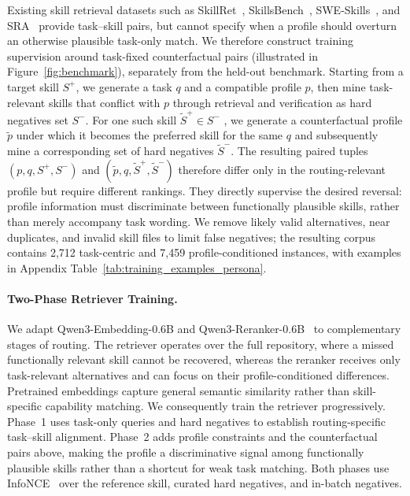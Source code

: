 \documentclass[letterpaper]{article} %
\begin{document}
Existing skill retrieval datasets such as SkillRet~\cite{cho2026skillretlargescalebenchmarkskill}, SkillsBench~\cite{li2026skillsbenchbenchmarkingagentskills}, SWE-Skills~\cite{han2026sweskillsbenchagentskillsactually}, and SRA~\cite{su2026skillretrievalaugmentationagentic} provide task--skill pairs, but cannot specify when a profile should overturn an otherwise plausible task-only match. We therefore construct training supervision around task-fixed counterfactual pairs (illustrated in Figure~\ref{fig:benchmark}), separately from the held-out benchmark. Starting from a target skill $S^{+}$, we generate a task $q$ and a compatible profile $p$, then mine task-relevant skills that conflict with $p$ through retrieval and verification as hard negatives set $S^{-}$. For one such skill $\tilde{S}^{+} \in S^{-}$ , we generate a counterfactual profile $\tilde{p}$ under which it becomes the preferred skill for the same $q$ and subsequently mine a corresponding set of hard negatives  $\tilde{S}^{-}$. The resulting paired tuples $(p, q, S^{+}, S^{-})$ and $(\tilde{p}, q, \tilde{S}^{+}, \tilde{S}^{-})$ therefore differ only in the routing-relevant profile but require different rankings. They directly supervise the desired reversal: profile information must discriminate between functionally plausible skills, rather than merely accompany task wording. We remove likely valid alternatives, near duplicates, and invalid skill files to limit false negatives; the resulting corpus contains 2,712 task-centric and 7,459 profile-conditioned instances, with examples in Appendix Table~\ref{tab:training_examples_persona}.

\paragraph{Two-Phase Retriever Training.}
We adapt Qwen3-Embedding-0.6B and Qwen3-Reranker-0.6B~\cite{qwen3embedding} to complementary stages of routing. The retriever operates over the full repository, where a missed functionally relevant skill cannot be recovered, whereas the reranker receives only task-relevant alternatives and can focus on their profile-conditioned differences. Pretrained embeddings capture general semantic similarity rather than skill-specific capability matching. We consequently train the retriever progressively. Phase~1 uses task-only queries and hard negatives to establish routing-specific task--skill alignment. Phase~2 adds profile constraints and the counterfactual pairs above, making the profile a discriminative signal among functionally plausible skills rather than a shortcut for weak task matching. Both phases use InfoNCE~\cite{oord2019representationlearningcontrastivepredictive} over the reference skill, curated hard negatives, and in-batch negatives.
\end{document}
